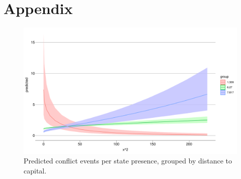 \documentclass[12pt]{article}
\begin{document}
\pagebreak
\section*{Appendix}






\begin{figure}[htpb]
	\centering
	\includegraphics[width=\linewidth]{"../R/Output/ggStatePlot.pdf"}
	\caption{Predicted conflict events per state presence, grouped by
	distance to capital.}
	\label{state_int}
\end{figure}
\end{document}
